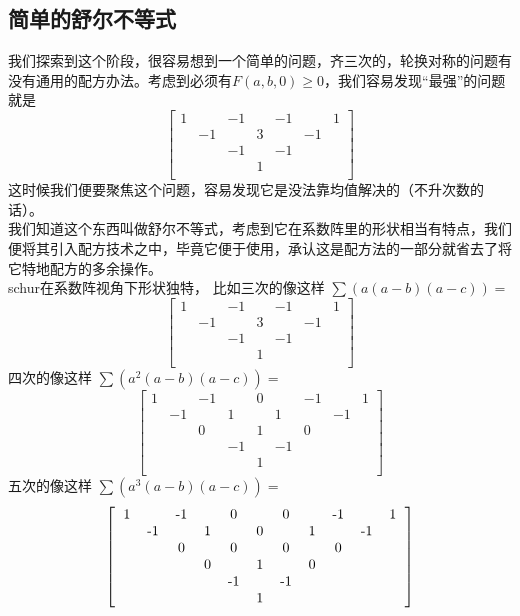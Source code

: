 \documentclass[UTF8]{ctexart}
\begin{document}
\subsection{简单的舒尔不等式}
我们探索到这个阶段，很容易想到一个简单的问题，齐三次的，轮换对称的问题有没有通用的配方办法。考虑到必须有$ F(a,b,0) \geq 0 $，我们容易发现“最强”的问题就是
\renewcommand*{\arraystretch}{1.732}\[\left[\begin{matrix}
	1& &-1& &-1& &1\\
	&-1& &3& &-1&\\
	& &-1& &-1& & \\
	& & &1& & &\\
\end{matrix}\right]\]
这时候我们便要聚焦这个问题，容易发现它是没法靠均值解决的（不升次数的话）。\\
我们知道这个东西叫做舒尔不等式，考虑到它在系数阵里的形状相当有特点，我们便将其引入配方技术之中，毕竟它便于使用，承认这是配方法的一部分就省去了将它特地配方的多余操作。\\
schur在系数阵视角下形状独特，
比如三次的像这样
$ \displaystyle \sum (a(a-b)(a-c))= $
\renewcommand*{\arraystretch}{1.732}\[\left[\begin{matrix}
	1& &-1& &-1& &1\\
	&-1& &3& &-1&\\
	& &-1& &-1& & \\
	& & &1& & &\\
\end{matrix}\right]\]
四次的像这样
$ \displaystyle \sum (a^{2}(a-b)(a-c))= $
\renewcommand*{\arraystretch}{1.732}\[\left[\begin{matrix}
	1& &-1& &0& &-1& &1\\
	&-1& &1& &1& &-1&\\
	& &0& &1& &0& &\\
	& & &-1& &-1& & &\\
	& & & &1& & & &\\
\end{matrix}\right]\]
五次的像这样
$ \displaystyle \sum (a^{3}(a-b)(a-c))= $
\renewcommand*{\arraystretch}{1.732}\[\left[\begin{matrix}
	\begin{tabular}{ccccccccccccc}
		1& &-1& &0& &0& &-1& &1\\
		&-1& &1& &0& &1& &-1&\\
		& &0& &0& &0& &0& &\\
		& & &0& &1& &0& & &\\
		& & & &-1& &-1& & & &\\
		& & & & &1& & & & &\\
	\end{tabular}
\end{matrix}\right]\]
\end{document}

